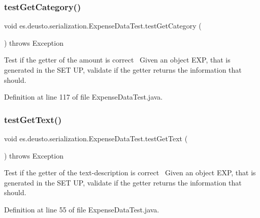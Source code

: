 \subsubsection{\texorpdfstring{test\+Get\+Category()}{testGetCategory()}}
{\footnotesize\ttfamily void es.\+deusto.\+serialization.\+Expense\+Data\+Test.\+test\+Get\+Category (\begin{DoxyParamCaption}{ }\end{DoxyParamCaption}) throws Exception}

Test if the getter of the amount is correct~\newline
Given an object E\+XP, that is generated in the S\+ET UP, validate if the getter returns the information that should.~\newline


Definition at line 117 of file Expense\+Data\+Test.\+java.

\mbox{\label{classes_1_1deusto_1_1serialization_1_1_expense_data_test_ae6098eb509929cfdf9e3848e9b9178a1}} 
\subsubsection{\texorpdfstring{test\+Get\+Text()}{testGetText()}}
{\footnotesize\ttfamily void es.\+deusto.\+serialization.\+Expense\+Data\+Test.\+test\+Get\+Text (\begin{DoxyParamCaption}{ }\end{DoxyParamCaption}) throws Exception}

Test if the getter of the text-\/description is correct~\newline
Given an object E\+XP, that is generated in the S\+ET UP, validate if the getter returns the information that should. 

Definition at line 55 of file Expense\+Data\+Test.\+java.

\mbox{\label{classes_1_1deusto_1_1serialization_1_1_expense_data_test_aa7fd4daec0dae9ed19ae737e666e4203}} 

